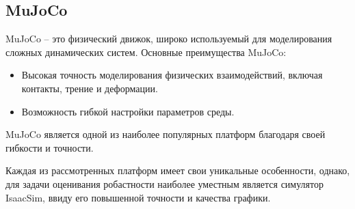         \subsection{MuJoCo}
        MuJoCo \cite{todorov2012mujoco} -- это физический движок, широко используемый для моделирования сложных динамических систем. Основные преимущества MuJoCo:
        \begin{itemize}
            \item Высокая точность моделирования физических взаимодействий, включая контакты, трение и деформации.
            \item Возможность гибкой настройки параметров среды.
        \end{itemize}
        MuJoCo является одной из наиболее популярных платформ благодаря своей гибкости и точности.
    
        Каждая из рассмотренных платформ имеет свои уникальные особенности, однако, для задачи оценивания робастности наиболее уместным является симулятор IsaacSim, ввиду его повышенной точности и качества графики. 
    